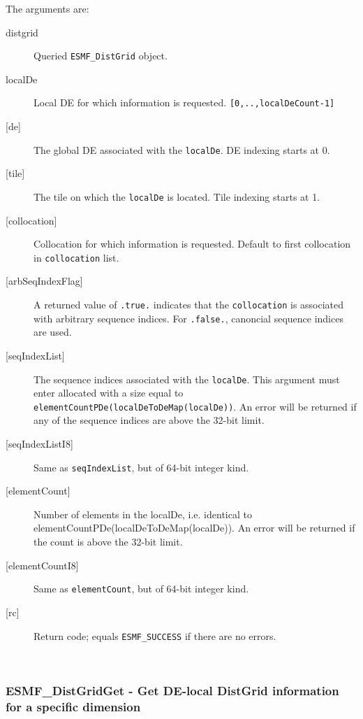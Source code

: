      The arguments are:
     \begin{description}
     \item[distgrid]
       Queried {\tt ESMF\_DistGrid} object.
     \item[localDe]
       Local DE for which information is requested. {\tt [0,..,localDeCount-1]}
     \item[{[de]}]
       The global DE associated with the {\tt localDe}. DE indexing starts at 0.
     \item[{[tile]}]
       The tile on which the {\tt localDe} is located. Tile indexing starts at 1.
     \item[{[collocation]}]
       Collocation for which information is requested. Default to first
       collocation in {\tt collocation} list.
     \item[{[arbSeqIndexFlag]}]
       A returned value of {\tt .true.} indicates that the {\tt collocation}
       is associated with arbitrary sequence indices. For {\tt .false.},
       canoncial sequence indices are used.
     \item[{[seqIndexList]}]
       The sequence indices associated with the {\tt localDe}. This argument must
       enter allocated with a size equal to 
       {\tt elementCountPDe(localDeToDeMap(localDe))}.
       An error will be returned if any of the sequence indices are above the
       32-bit limit.
     \item[{[seqIndexListI8]}]
       Same as {\tt seqIndexList}, but of 64-bit integer kind.
     \item[{[elementCount]}]
       Number of elements in the localDe, i.e. identical to
       elementCountPDe(localDeToDeMap(localDe)).
       An error will be returned if the count is above the 32-bit limit.
     \item[{[elementCountI8]}]
       Same as {\tt elementCount}, but of 64-bit integer kind.
     \item[{[rc]}]
       Return code; equals {\tt ESMF\_SUCCESS} if there are no errors.
     \end{description}
   
 
\mbox{}\hrulefill\ 
 
\subsubsection [ESMF\_DistGridGet] {ESMF\_DistGridGet - Get DE-local DistGrid information for a specific dimension}



